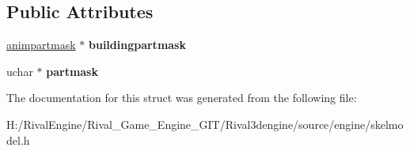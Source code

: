 \subsection*{Public Attributes}
\begin{DoxyCompactItemize}
\item 
\mbox{\label{structskelmodel_1_1skelpart_a201d29de7223867c4f10111fab41d5ee}} 
\hyperlink{structskelmodel_1_1animpartmask}{animpartmask} $\ast$ {\bfseries buildingpartmask}
\item 
\mbox{\label{structskelmodel_1_1skelpart_aacbf59fe096cf69ea981a38787e2dfbd}} 
uchar $\ast$ {\bfseries partmask}
\end{DoxyCompactItemize}


The documentation for this struct was generated from the following file\+:\begin{DoxyCompactItemize}
\item 
H\+:/\+Rival\+Engine/\+Rival\+\_\+\+Game\+\_\+\+Engine\+\_\+\+G\+I\+T/\+Rival3dengine/source/engine/skelmodel.\+h\end{DoxyCompactItemize}
